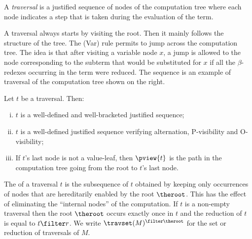 A \emph{traversal} is a justified sequence of nodes of the computation tree where each node indicates a step that is taken during the evaluation of the term.



 A traversal always starts by visiting the root. Then it mainly follows the structure of the tree. The (Var) rule permits to jump across the computation tree. The idea is that after visiting a variable node $x$, a jump is allowed to the node corresponding to the subterm that would be substituted for $x$ if all the $\beta$-redexes occurring in the term were reduced. The sequence 
 is an example of traversal of the computation tree shown on the right.

\begin{proposition}
\label{prop:pviewtrav_is_path} Let $t$ be a traversal. Then:
\begin{enumerate}[(i)]
\item $t$ is a well-defined and well-bracketed justified sequence;
\item $t$ is a well-defined justified sequence verifying alternation, P-visibility and O-visibility;
\item If $t$'s last node is not a value-leaf, then $\pview{t}$ is the path in the computation tree going from the root to $t$'s last node.
\end{enumerate}
\end{proposition}

The  of a traversal $t$ is the subsequence of $t$ obtained by keeping only occurrences of nodes that are hereditarily enabled by the root $\theroot$. This has the effect of eliminating the ``internal nodes'' of the computation. If $t$ is a non-empty traversal then the root $\theroot$ occurs exactly once in $t$ and the reduction of $t$ is equal to $t \filter r$. We write $\travset(M)^{\filter \theroot}$ for the set or reduction of traversals of $M$.

